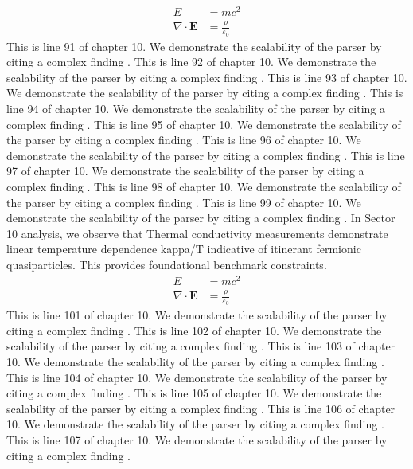 \begin{align*}
  E &= mc^2 \\
  \nabla \cdot \mathbf{E} &= \frac{\rho}{\varepsilon_0}
\end{align*}
This is line 91 of chapter 10. We demonstrate the scalability of the parser by citing a complex finding \cite{ref10_91}.
This is line 92 of chapter 10. We demonstrate the scalability of the parser by citing a complex finding \cite{ref10_92}.
This is line 93 of chapter 10. We demonstrate the scalability of the parser by citing a complex finding \cite{ref10_93}.
This is line 94 of chapter 10. We demonstrate the scalability of the parser by citing a complex finding \cite{ref10_94}.
This is line 95 of chapter 10. We demonstrate the scalability of the parser by citing a complex finding \cite{ref10_95}.
This is line 96 of chapter 10. We demonstrate the scalability of the parser by citing a complex finding \cite{ref10_96}.
This is line 97 of chapter 10. We demonstrate the scalability of the parser by citing a complex finding \cite{ref10_97}.
This is line 98 of chapter 10. We demonstrate the scalability of the parser by citing a complex finding \cite{ref10_98}.
This is line 99 of chapter 10. We demonstrate the scalability of the parser by citing a complex finding \cite{ref10_99}.
In Sector 10 analysis, we observe that Thermal conductivity measurements demonstrate linear temperature dependence kappa/T indicative of itinerant fermionic quasiparticles. This provides foundational benchmark constraints.
\begin{align*}
  E &= mc^2 \\
  \nabla \cdot \mathbf{E} &= \frac{\rho}{\varepsilon_0}
\end{align*}
This is line 101 of chapter 10. We demonstrate the scalability of the parser by citing a complex finding \cite{ref10_101}.
This is line 102 of chapter 10. We demonstrate the scalability of the parser by citing a complex finding \cite{ref10_102}.
This is line 103 of chapter 10. We demonstrate the scalability of the parser by citing a complex finding \cite{ref10_103}.
This is line 104 of chapter 10. We demonstrate the scalability of the parser by citing a complex finding \cite{ref10_104}.
This is line 105 of chapter 10. We demonstrate the scalability of the parser by citing a complex finding \cite{ref10_105}.
This is line 106 of chapter 10. We demonstrate the scalability of the parser by citing a complex finding \cite{ref10_106}.
This is line 107 of chapter 10. We demonstrate the scalability of the parser by citing a complex finding \cite{ref10_107}.
